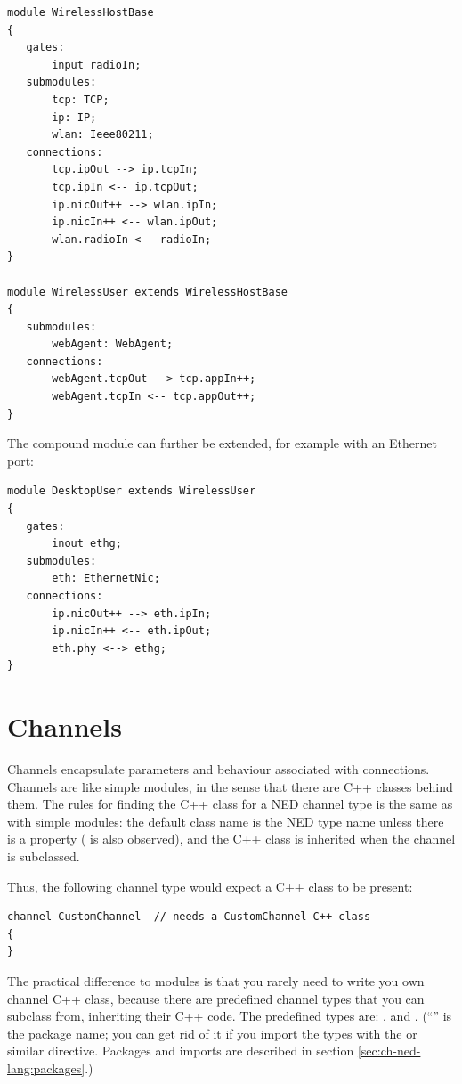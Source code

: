 \begin{Verbatim}
module WirelessHostBase
{
   gates:
       input radioIn;
   submodules:
       tcp: TCP;
       ip: IP;
       wlan: Ieee80211;
   connections:
       tcp.ipOut --> ip.tcpIn;
       tcp.ipIn <-- ip.tcpOut;
       ip.nicOut++ --> wlan.ipIn;
       ip.nicIn++ <-- wlan.ipOut;
       wlan.radioIn <-- radioIn;
}

module WirelessUser extends WirelessHostBase
{
   submodules:
       webAgent: WebAgent;
   connections:
       webAgent.tcpOut --> tcp.appIn++;
       webAgent.tcpIn <-- tcp.appOut++;
}
\end{Verbatim}

The  compound module can further be extended,
for example with an Ethernet port:

\begin{Verbatim}
module DesktopUser extends WirelessUser
{
   gates:
       inout ethg;
   submodules:
       eth: EthernetNic;
   connections:
       ip.nicOut++ --> eth.ipIn;
       ip.nicIn++ <-- eth.ipOut;
       eth.phy <--> ethg;
}
\end{Verbatim}



\section{Channels}
\label{sec:ch-ned-lang:channels}

Channels encapsulate parameters and behaviour associated with connections.
Channels are like simple modules, in the sense that there are C++ classes
behind them. The rules for finding the C++ class for a NED channel type is
the same as with simple modules: the default class name is the NED type
name unless there is a  property ( is also
observed), and the C++ class is inherited when the channel is subclassed.

Thus, the following channel type would expect a  C++ class
to be present:

\begin{Verbatim}
channel CustomChannel  // needs a CustomChannel C++ class
{
}
\end{Verbatim}

The practical difference to modules is that you rarely need to write you own
channel C++ class, because there are predefined channel types that you can
subclass from, inheriting their C++ code. The predefined types are:
,  and .
(``'' is the package name; you can get rid of it if you import the types
with the  or similar directive. Packages and imports
are described in section \ref{sec:ch-ned-lang:packages}.)

